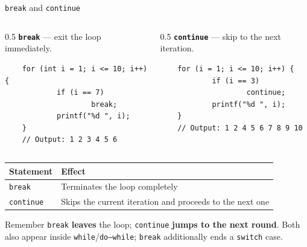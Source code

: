 \documentclass[aspectratio=169]{beamer}
\begin{document}
	\begin{frame}[fragile]{\texttt{break} and \texttt{continue}}
		\begin{columns}[T]
			\begin{column}{0.5\textwidth}
				\textbf{\texttt{break}} --- exit the loop immediately.
\begin{lstlisting}
	for (int i = 1; i <= 10; i++) {
			if (i == 7) 
					break;
			printf("%d ", i);
	}
	// Output: 1 2 3 4 5 6
\end{lstlisting}
			\end{column}
			\begin{column}{0.5\textwidth}
				\textbf{\texttt{continue}} --- skip to the next iteration.
\begin{lstlisting}
	for (i = 1; i <= 10; i++) {
			if (i == 3)
					continue;
			printf("%d ", i);
	}
	// Output: 1 2 4 5 6 7 8 9 10
\end{lstlisting}
			\end{column}
		\end{columns}
		
		\begin{table}
			\centering
			\renewcommand{\arraystretch}{0.8}
			\begin{tabular}{@{}ll@{}}
				\toprule
				\textbf{Statement} & \textbf{Effect} \\
				\midrule
				\texttt{break}    & Terminates the loop completely \\
				\texttt{continue} & Skips the current iteration and proceeds to the next one \\
				\bottomrule
			\end{tabular}
		\end{table}
		
		\begin{block}{Remember}
			\small \texttt{break} \textbf{leaves} the loop; \texttt{continue} \textbf{jumps to the next round}. Both also appear inside \texttt{while}/\texttt{do--while}; \texttt{break} additionally ends a \texttt{switch} case.
		\end{block}
		
	\end{frame}
	
\end{document}
